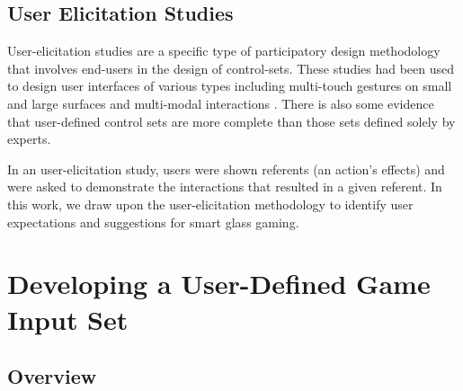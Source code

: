 \documentclass{sigchi}
\begin{document}
    \subsection{User Elicitation Studies}
    User-elicitation studies are a specific type of participatory design methodology that involves end-users in the design of control-sets\cite{Good:1984:BUI:358274.358284,Morris:2012:WWI:2396636.2396651}. These studies had been used to design user interfaces of various types including multi-touch gestures on small and large surfaces\cite{Anthony:2012:IRC:2396636.2396671,Epps:2006:SHS:1125451.1125601,Wobbrock:2009:UGS:1518701.1518866,Findlater:2012:BQA:2207676.2208660} and multi-modal interactions \cite{Morris:2012:WWI:2396636.2396651,Valdes:2014:EDS:2611222.2557373}. There is also some evidence that user-defined control sets are more complete than those sets defined solely by experts\cite{Anthony:2012:IRC:2396636.2396671,Pyryeskin:2012:CEG:2396636.2396638,Wobbrock:2009:UGS:1518701.1518866}.

    In an user-elicitation study, users were shown referents (an action's effects) and were asked to demonstrate the interactions that resulted in a given referent\cite{Wobbrock:2009:UGS:1518701.1518866}. In this work, we draw upon the user-elicitation methodology to identify user expectations and suggestions for smart glass gaming.

\section{Developing a User-Defined Game Input Set}


    \subsection {Overview}

\end{document}
